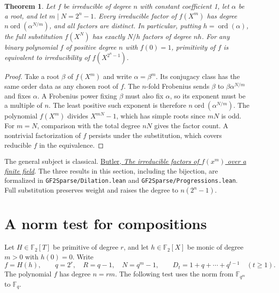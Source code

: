 \documentclass[11pt]{article}
\newtheorem{theorem}{Theorem}
\newcommand{\F}{\mathbb F_2}
\newcommand{\ord}{\operatorname{ord}}
\begin{document}
\begin{theorem}\label{thm:dilation}
Let \(f\) be irreducible of degree \(n\) with constant coefficient 1,
let \(\alpha\) be a root, and let \(m\mid N=2^n-1\).
Every irreducible factor of \(f(X^m)\) has degree
\(n\ord(\alpha^{N/m})\), and all factors are distinct. In particular,
putting \(h=\ord(\alpha)\), the full substitution \(f(X^N)\) has
exactly \(N/h\) factors of degree \(nh\).
For any binary polynomial \(f\) of positive degree \(n\) with
\(f(0)=1\), primitivity of \(f\) is equivalent to irreducibility of
\(f(X^{2^n-1})\).
\end{theorem}
\begin{proof}
Take a root \(\beta\) of \(f(X^m)\) and write \(\alpha=\beta^m\).
Its conjugacy class has the same order data as any chosen root of \(f\).
The \(n\)-fold Frobenius sends \(\beta\) to
\(\beta\alpha^{N/m}\) and fixes \(\alpha\). A Frobenius power fixing
\(\beta\) must also fix \(\alpha\), so its exponent must be a multiple
of \(n\). The least positive such exponent is therefore
\(n\ord(\alpha^{N/m})\). The polynomial \(f(X^m)\) divides
\(X^{mN}-1\), which has simple roots since \(mN\) is odd.
For \(m=N\), comparison with the total degree \(nN\) gives the factor
count. A nontrivial factorization of \(f\) persists under the
substitution, which covers reducible \(f\) in the equivalence.
\end{proof}
The general subject is classical.
\href{https://doi.org/10.1112/jlms/s1-30.4.480}{Butler,
\emph{The irreducible factors of \(f(x^m)\) over a finite field}}.
The three results in this section, including the bijection, are
formalized in \texttt{GF2Sparse/Dilation.lean} and
\texttt{GF2Sparse/Progressions.lean}. Full substitution preserves
weight and raises the degree to \(n(2^n-1)\).

\section{A norm test for compositions}
Let \(H\in\F[T]\) be primitive of degree \(r\), and let \(h\in\F[X]\)
be monic of degree \(m>0\) with \(h(0)=0\). Write
\[
 f=H(h),\qquad q=2^r,\quad R=q-1,\quad N=q^m-1,\qquad
 D_t=1+q+\cdots+q^{t-1}\quad(t\ge1).
\]
The polynomial \(f\) has degree \(n=rm\). The following test uses
the norm from \(\mathbb F_{q^m}\) to \(\mathbb F_q\).
\end{document}

